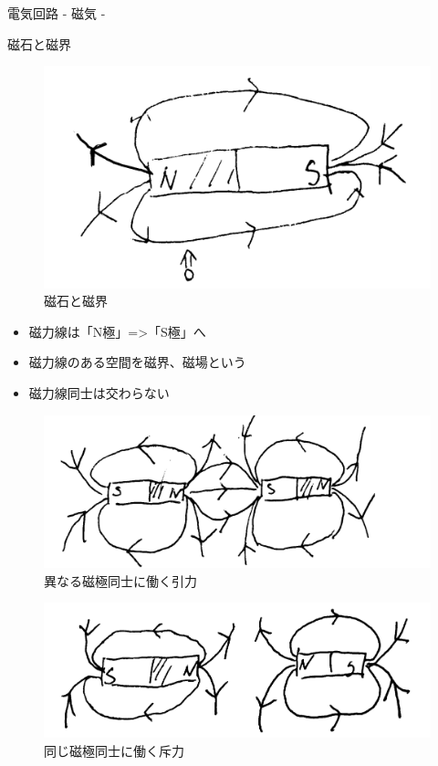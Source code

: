     {\large 電気回路 - 磁気 -}
    \begin{multicols}{3}
        \begin{itembox}[l]{磁石と磁界}
            \begin{figure}[H]
                \centering
                \label{fig:magnet}
                \includegraphics[width=0.7\linewidth]{fig/磁界.png}
                \caption{磁石と磁界}
            \end{figure}
            \begin{itemize}
                \item 磁力線は「N極」=>「S極」へ
                \item 磁力線のある空間を磁界、磁場という
                \item 磁力線同士は交わらない
            \end{itemize}
            \begin{figure}[H]
                \centering
                \label{fig:引力}
                \includegraphics[width=0.7\linewidth]{fig/引力.png}
                \caption{異なる磁極同士に働く引力}
            \end{figure}
            \begin{figure}[H]
                \centering
                \label{fig:斥力}
                \includegraphics[width=0.7\linewidth]{fig/斥力.png}
                \caption{同じ磁極同士に働く斥力}
            \end{figure}
        \end{itembox}


\end{multicols}
